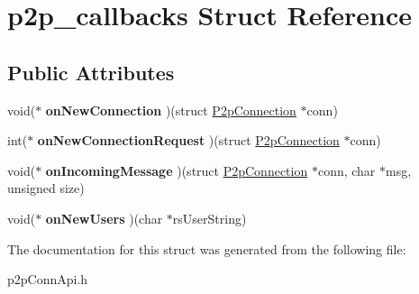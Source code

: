 \hypertarget{structp2p__callbacks}{
\section{p2p\_\-callbacks Struct Reference}
\label{structp2p__callbacks}
}
\subsection*{Public Attributes}
\begin{DoxyCompactItemize}
\item 
\hypertarget{structp2p__callbacks_a36af71a9af29231e97b8bb06bf6b9403}{
void($\ast$ {\bfseries onNewConnection} )(struct \hyperlink{structP2pConnection}{P2pConnection} $\ast$conn)}
\label{structp2p__callbacks_a36af71a9af29231e97b8bb06bf6b9403}

\item 
\hypertarget{structp2p__callbacks_a71f50a9121e8a180623c6bd957b827f0}{
int($\ast$ {\bfseries onNewConnectionRequest} )(struct \hyperlink{structP2pConnection}{P2pConnection} $\ast$conn)}
\label{structp2p__callbacks_a71f50a9121e8a180623c6bd957b827f0}

\item 
\hypertarget{structp2p__callbacks_a54ee4b7b01e856d7f75537413fce6fb7}{
void($\ast$ {\bfseries onIncomingMessage} )(struct \hyperlink{structP2pConnection}{P2pConnection} $\ast$conn, char $\ast$msg, unsigned size)}
\label{structp2p__callbacks_a54ee4b7b01e856d7f75537413fce6fb7}

\item 
\hypertarget{structp2p__callbacks_a74ecf2c586bb5733fd6efc086e0073a9}{
void($\ast$ {\bfseries onNewUsers} )(char $\ast$rsUserString)}
\label{structp2p__callbacks_a74ecf2c586bb5733fd6efc086e0073a9}

\end{DoxyCompactItemize}


The documentation for this struct was generated from the following file:\begin{DoxyCompactItemize}
\item 
p2pConnApi.h\end{DoxyCompactItemize}
